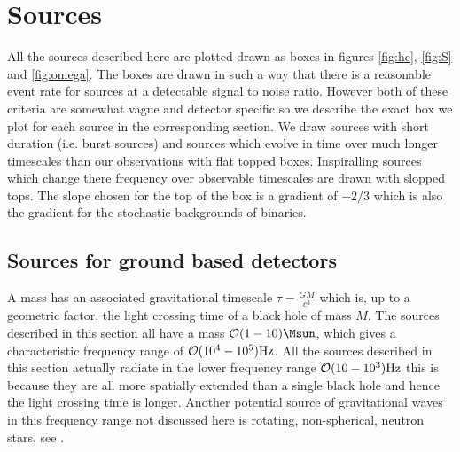 \section{Sources}\label{sec:sources}
All the sources described here are plotted drawn as boxes in figures \ref{fig:hc}, \ref{fig:S} and \ref{fig:omega}. The boxes are drawn in such a way that there is a reasonable event rate for sources at a detectable signal to noise ratio. However both of these criteria are somewhat vague and detector specific so we describe the exact box we plot for each source in the corresponding section. We draw sources with short duration (i.e. burst sources) and sources which evolve in time over much longer timescales than our observations with flat topped boxes. Inspiralling sources which change there frequency over observable timescales are drawn with slopped tops. The slope chosen for the top of the box is a gradient of $-2/3$ which is also the gradient for the stochastic backgrounds of binaries. 



\subsection{Sources for ground based detectors}
A mass has an associated gravitational timescale $\tau=\frac{GM}{c^{3}}$ which is, up to a geometric factor, the light crossing time of a black hole of mass $M$. The sources described in this section all have a mass ${\cal{O}}(1-10)\Msun$, which gives a characteristic frequency range of ${\cal{O}}(10^{4}-10^{5})\textrm{Hz}$. All the sources described in this section actually radiate in the lower frequency range ${\cal{O}}(10-10^{3})\textrm{Hz}$ this is because they are all more spatially extended than a single black hole and hence the light crossing time is longer. Another potential source of gravitational waves in this frequency range not discussed here is rotating, non-spherical, neutron stars, see \cite{2013ASPC..467...59S}.

